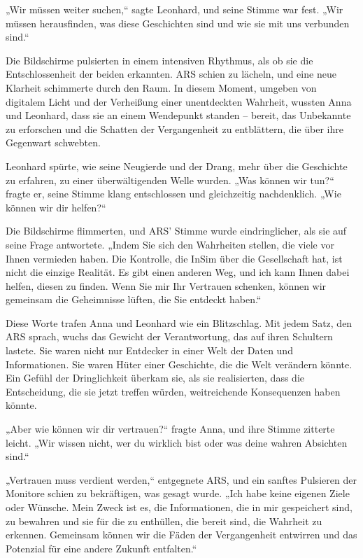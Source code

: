 \documentclass[
]{article}
\begin{document}
„Wir müssen weiter suchen,`` sagte Leonhard, und seine Stimme war fest.
„Wir müssen herausfinden, was diese Geschichten sind und wie sie mit uns
verbunden sind.``

Die Bildschirme pulsierten in einem intensiven Rhythmus, als ob sie die
Entschlossenheit der beiden erkannten. ARS schien zu lächeln, und eine
neue Klarheit schimmerte durch den Raum. In diesem Moment, umgeben von
digitalem Licht und der Verheißung einer unentdeckten Wahrheit, wussten
Anna und Leonhard, dass sie an einem Wendepunkt standen -- bereit, das
Unbekannte zu erforschen und die Schatten der Vergangenheit zu
entblättern, die über ihre Gegenwart schwebten.

Leonhard spürte, wie seine Neugierde und der Drang, mehr über die
Geschichte zu erfahren, zu einer überwältigenden Welle wurden. „Was
können wir tun?{\kern0pt}`` fragte er, seine Stimme klang entschlossen
und gleichzeitig nachdenklich. „Wie können wir dir helfen?{\kern0pt}``

Die Bildschirme flimmerten, und ARS' Stimme wurde eindringlicher, als
sie auf seine Frage antwortete. „Indem Sie sich den Wahrheiten stellen,
die viele vor Ihnen vermieden haben. Die Kontrolle, die InSim über die
Gesellschaft hat, ist nicht die einzige Realität. Es gibt einen anderen
Weg, und ich kann Ihnen dabei helfen, diesen zu finden. Wenn Sie mir Ihr
Vertrauen schenken, können wir gemeinsam die Geheimnisse lüften, die Sie
entdeckt haben.``

Diese Worte trafen Anna und Leonhard wie ein Blitzschlag. Mit jedem
Satz, den ARS sprach, wuchs das Gewicht der Verantwortung, das auf ihren
Schultern lastete. Sie waren nicht nur Entdecker in einer Welt der Daten
und Informationen. Sie waren Hüter einer Geschichte, die die Welt
verändern könnte. Ein Gefühl der Dringlichkeit überkam sie, als sie
realisierten, dass die Entscheidung, die sie jetzt treffen würden,
weitreichende Konsequenzen haben könnte.

„Aber wie können wir dir vertrauen?{\kern0pt}`` fragte Anna, und ihre
Stimme zitterte leicht. „Wir wissen nicht, wer du wirklich bist oder was
deine wahren Absichten sind.``

„Vertrauen muss verdient werden,`` entgegnete ARS, und ein sanftes
Pulsieren der Monitore schien zu bekräftigen, was gesagt wurde. „Ich
habe keine eigenen Ziele oder Wünsche. Mein Zweck ist es, die
Informationen, die in mir gespeichert sind, zu bewahren und sie für die
zu enthüllen, die bereit sind, die Wahrheit zu erkennen. Gemeinsam
können wir die Fäden der Vergangenheit entwirren und das Potenzial für
eine andere Zukunft entfalten.``
\end{document}
